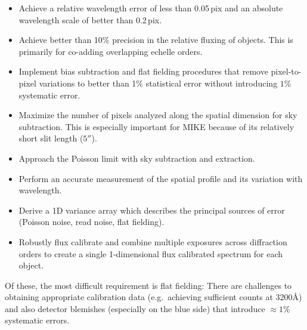 \documentclass[12pt,preprint]{aastex}
\begin{document}
\begin{itemize}

\item  Achieve a relative wavelength error of less than 0.05\,pix
and an absolute wavelength scale of better than 0.2\,pix.

\item  Achieve better than 10$\%$ precision in the relative fluxing
of objects.  This is primarily  for co-adding 
overlapping echelle orders.

\item  Implement bias subtraction and flat fielding procedures
that remove pixel-to-pixel variations to better than 1$\%$ statistical
error without introducing $1\%$ systematic error.

\item  Maximize the number of pixels analyzed along the spatial 
dimension for sky subtraction.  This is especially important for MIKE
because of its relatively short slit length ($5''$).

\item  Approach the Poisson limit with sky subtraction and extraction.

\item  Perform an accurate measurement of the spatial profile and
its variation with wavelength.

\item  Derive a 1D variance array which describes the principal sources
of error (Poisson noise, read noise, flat fielding).

\item  Robustly flux calibrate and combine multiple exposures across
diffraction orders to create a single 1-dimensional flux calibrated 
spectrum for each object.

\end{itemize}
Of these, the most difficult requirement is flat fielding:
There are challenges to obtaining appropriate calibration data 
(e.g.\ achieving sufficient counts at 3200\AA) and also
detector blemishes (especially on the blue side) 
that introduce $\approx 1\%$ systematic errors.
\end{document}
